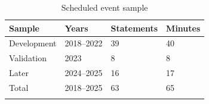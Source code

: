 \begin{table}[htbp]
\centering
{\fontsize{10}{12}\selectfont\renewcommand{\arraystretch}{1.22}\setlength{\tabcolsep}{4pt}
\begin{tabularx}{\linewidth}{@{}L{42mm}L{40mm}C{32mm}X@{}}
\toprule{}
\textbf{Sample} & \textbf{Years} & \textbf{Statements} & \textbf{Minutes} \\ \midrule
Development & 2018--2022 & 39 & 40 \\ \hline
Validation & 2023 & 8 & 8 \\ \hline
Later & 2024--2025 & 16 & 17 \\ \hline
Total & 2018--2025 & 63 & 65 \\ \hline
{}\bottomrule\end{tabularx}}
\caption[Scheduled event sample]{Scheduled event sample}\label{tab:events}
\end{table}
